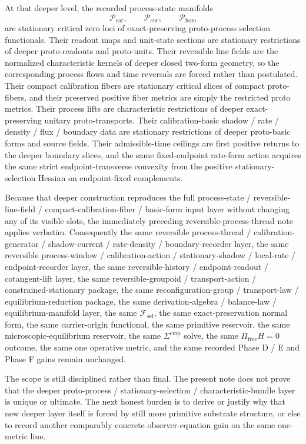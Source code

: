 \documentclass[11pt]{article}
\newcommand{\StemFunctional}{\mathscr F_{\mathrm{sel}}}
\newcommand{\TensorProcSpace}{\mathcal P_{\mathrm{car}}}
\newcommand{\CurProcSpace}{\mathcal P_{\mathrm{cur}}}
\newcommand{\HomProcSpace}{\mathcal P_{\mathrm{hom}}}
\begin{document}
At that deeper level, the recorded process-state manifolds
\[
\TensorProcSpace,\qquad
\CurProcSpace,\qquad
\HomProcSpace
\]
are stationary critical zero loci of exact-preserving proto-process selection functionals. Their readout maps and unit-state sections are stationary restrictions of deeper proto-readouts and proto-units. Their reversible line fields are the normalized characteristic kernels of deeper closed two-form geometry, so the corresponding process flows and time reversals are forced rather than postulated. Their compact calibration fibers are stationary critical slices of compact proto-fibers, and their preserved positive fiber metrics are simply the restricted proto metrics. Their process lifts are characteristic restrictions of deeper exact-preserving unitary proto-transports. Their calibration-basic shadow / rate / density / flux / boundary data are stationary restrictions of deeper proto-basic forms and source fields. Their admissible-time ceilings are first positive returns to the deeper boundary slices, and the same fixed-endpoint rate-form action acquires the same strict endpoint-transverse convexity from the positive stationary-selection Hessian on endpoint-fixed complements.

Because that deeper construction reproduces the full process-state / reversible-line-field / compact-calibration-fiber / basic-form input layer without changing any of its visible slots, the immediately preceding reversible-process-thread note applies verbatim. Consequently the same reversible process-thread / calibration-generator / shadow-current / rate-density / boundary-recorder layer, the same reversible process-window / calibration-action / stationary-shadow / local-rate / endpoint-recorder layer, the same reversible-history / endpoint-readout / cotangent-lift layer, the same reversible-groupoid / transport-action / constrained-stationary package, the same reconfiguration-group / transport-law / equilibrium-reduction package, the same derivation-algebra / balance-law / equilibrium-manifold layer, the same \(\StemFunctional\), the same exact-preservation normal form, the same carrier-origin functional, the same primitive reservoir, the same microscopic-equilibrium reservoir, the same \(\Sigma^{\mathrm{cmp}}\) solve, the same \(\Pi_{\mathrm{free}}H=0\) outcome, the same one operative metric, and the same recorded Phase D / E and Phase F gains remain unchanged.

The scope is still disciplined rather than final. The present note does not prove that the deeper proto-process / stationary-selection / characteristic-bundle layer is unique or ultimate. The next honest burden is to derive or justify why that new deeper layer itself is forced by still more primitive substrate structure, or else to record another comparably concrete observer-equation gain on the same one-metric line.
\end{document}

